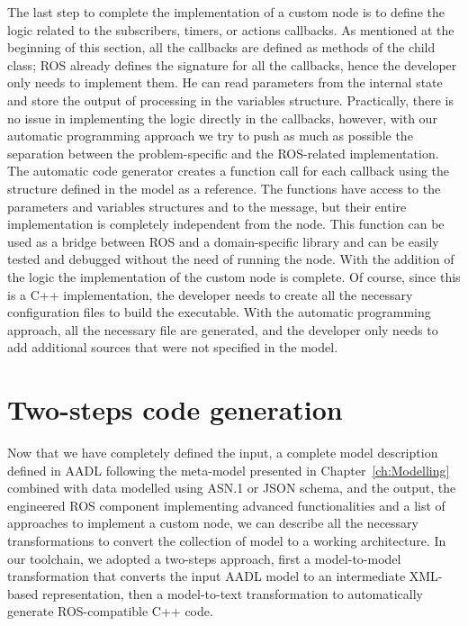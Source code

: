 The last step to complete the implementation of a custom node is to define the logic related to the subscribers, timers, or actions callbacks. As mentioned at the beginning of this section, all the callbacks are defined as methods of the child class; ROS already defines the signature for all the callbacks, hence the developer only needs to implement them. He can read parameters from the internal state and store the output of processing in the variables structure. Practically, there is no issue in implementing the logic directly in the callbacks, however, with our automatic programming approach we try to push as much as possible the separation between the problem-specific and the ROS-related implementation. The automatic code generator creates a function call for each callback using the structure defined in the model as a reference. The functions have access to the parameters and variables structures and to the message, but their entire implementation is completely independent from the node. This function can be used as a bridge between ROS and a domain-specific library and can be easily tested and debugged without the need of running the node. With the addition of the logic the implementation of the custom node is complete. Of course, since this is a C++ implementation, the developer needs to create all the necessary configuration files to build the executable. With the automatic programming approach, all the necessary file are generated, and the developer only needs to add additional sources that were not specified in the model.

\section{Two-steps code generation}
Now that we have completely defined the input, a complete model description defined in AADL following the meta-model presented in Chapter~\ref{ch:Modelling} combined with data modelled using ASN.1 or JSON schema, and the output, the engineered ROS component implementing advanced functionalities and a list of approaches to implement a custom node, we can describe all the necessary transformations to convert the collection of model to a working architecture. In our toolchain, we adopted a two-steps approach, first a model-to-model transformation that converts the  input AADL model to an intermediate XML-based representation, then a model-to-text transformation to automatically generate ROS-compatible C++ code.

